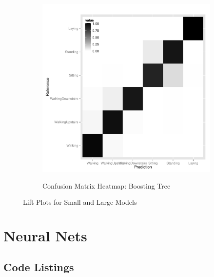 \begin{landscape}
\begin{figure}
\begin{subfigure}[b]{0.45\textwidth}
    \label{fig:lift_rf}
  \end{subfigure}
  \hfill
    \begin{subfigure}[b]{0.45\textwidth}
    \caption{Confusion Matrix Heatmap: Boosting Tree}
    \includegraphics[width=\textwidth]{heatmap_boost.pdf}
    \label{fig:lift_boost}
  \end{subfigure}
  \caption{Lift Plots for Small and Large Models}
\end{figure}
\end{landscape}


\section{Neural Nets} \label{nnets}




\clearpage
\begin{appendices}
\section{Code Listings}

\end{appendices}



% 

